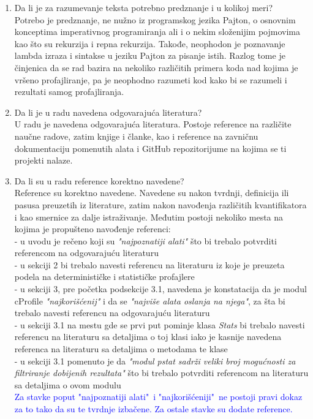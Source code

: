 \documentclass[a4paper]{report}
\newcommand{\odgovor}[1]{\textcolor{blue}{#1}}
\begin{document}
\begin{enumerate}
\item Da li je za razumevanje teksta potrebno predznanje i u kolikoj meri?\\
Potrebo je predznanje, ne nužno iz programskog jezika Pajton, o osnovnim konceptima imperativnog programiranja ali i o nekim složenijim pojmovima kao što su rekurzija i repna rekurzija. Takođe, neophodon je poznavanje lambda izraza i sintakse u jeziku Pajton za pisanje istih. Razlog tome je činjenica da se rad bazira na nekoliko različitih primera koda nad kojima je vršeno profajliranje, pa je neophodno razumeti kod kako bi se razumeli i rezultati samog profajliranja.

\item Da li je u radu navedena odgovarajuća literatura?\\
U radu je navedena odgovarajuća literatura. Postoje reference na različite naučne radove, zatim knjige i članke, kao i reference na zavničnu dokumentaciju pomenutih alata i GitHub repozitorijume na kojima se ti projekti nalaze.

\item Da li su u radu reference korektno navedene?\\
Reference su korektno navedene. Navedene su nakon tvrdnji, definicija ili pasusa preuzetih iz literature, zatim nakon navođenja različitih kvantifikatora i kao smernice za dalje istraživanje. Međutim postoji nekoliko mesta na kojima je propušteno navođenje referenci:\\
- u uvodu je rečeno koji su \emph{"najpoznatiji alati"} što bi trebalo potvrditi referencom na odgovarajuću literaturu\\
- u sekciji 2 bi trebalo navesti referencu na literaturu iz koje je preuzeta podela na determinističke i statističke profajlere\\
- u sekciji 3, pre početka podsekcije 3.1, navedena je konstatacija da je modul cProfile \emph{"najkorišćenij"}  i da se \emph{"najviše alata oslanja na njega"}, za šta bi trebalo navesti referencu na odgovarajuću literaturu\\
- u sekciji 3.1 na mestu gde se prvi put pominje klasa \emph{Stats} bi trebalo navesti referencu na literaturu sa detaljima o toj klasi iako je kasnije navedena referenca na literaturu sa detaljima o metodama te klase\\
- u sekciji 3.1 pomenuto je da \emph{"modul pstat sadrži veliki broj mogućnosti za filtriranje dobijenih rezultata"} što bi trebalo potvrditi referencom na literaturu sa detaljima o ovom modulu\\
\odgovor{Za stavke poput "najpoznatiji alati"\ i "najkorišćeniji"\ ne postoji pravi dokaz za to tako da su te tvrdnje izbačene. Za ostale stavke su dodate reference.}


\end{enumerate}
\end{document}
